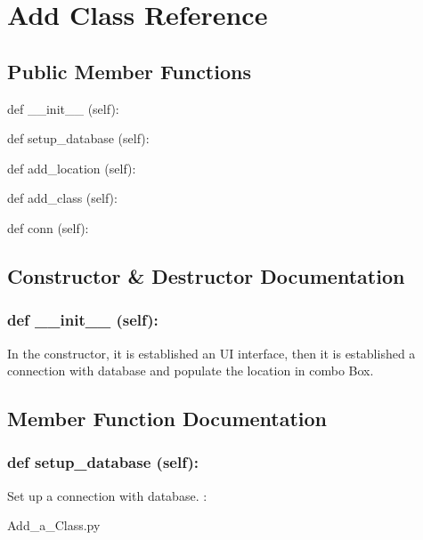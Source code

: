 \hypertarget{Add_Class}{\section{Add Class Reference}
\label{Add_Class}
}
\subsection*{Public Member Functions}
\begin{DoxyCompactItemize}
\item 
def {\_\_init\_\_} (self):
\item 
def {setup\_database} (self):
\item 
def {add\_location} (self):
\item 
def {add\_class} (self):
\item 
def {conn} (self):
\end{DoxyCompactItemize}

\subsection{Constructor \& Destructor Documentation}
\hypertarget{class_poly_aa3def076b74bed67904976ad4f9fe9b1}{
\subsubsection[{def __init__ (self):}]{\setlength{\rightskip}{0pt plus 5cm}def {\_\_init\_\_} (self): 
}}
In the constructor, it is established an UI interface, then it is  established a connection with database and populate the location in combo Box.
 

\subsection{Member Function Documentation}
\hypertarget{class_poly_a14a7ad77ce612b0c54f531d307ee4b39}{
\subsubsection[{def setup_database (self):}]{\setlength{\rightskip}{0pt plus 5cm}def {setup\_database} (self):}}\label{class_poly_a14a7ad77ce612b0c54f531d307ee4b39}
Set up a connection with database.
:\begin{DoxyCompactItemize}
\item 
Add\_a\_Class.\-py\end{DoxyCompactItemize}

